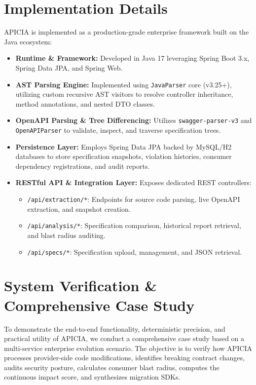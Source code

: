 \documentclass[conference]{IEEEtran}
\begin{document}
\section{Implementation Details}
\label{sec:implementation}

APICIA is implemented as a production-grade enterprise framework built on the Java ecosystem:
\begin{itemize}
    \item \textbf{Runtime \& Framework:} Developed in Java 17 leveraging Spring Boot 3.x, Spring Data JPA, and Spring Web.
    \item \textbf{AST Parsing Engine:} Implemented using \texttt{JavaParser} core (v3.25+), utilizing custom recursive AST visitors to resolve controller inheritance, method annotations, and nested DTO classes.
    \item \textbf{OpenAPI Parsing \& Tree Differencing:} Utilizes \texttt{swagger-parser-v3} and \texttt{OpenAPIParser} to validate, inspect, and traverse specification trees.
    \item \textbf{Persistence Layer:} Employs Spring Data JPA backed by MySQL/H2 databases to store specification snapshots, violation histories, consumer dependency registrations, and audit reports.
    \item \textbf{RESTful API & Integration Layer:} Exposes dedicated REST controllers:
    \begin{itemize}
        \item \texttt{/api/extraction/*}: Endpoints for source code parsing, live OpenAPI extraction, and snapshot creation.
        \item \texttt{/api/analysis/*}: Specification comparison, historical report retrieval, and blast radius auditing.
        \item \texttt{/api/specs/*}: Specification upload, management, and JSON retrieval.
    \end{itemize}
\end{itemize}

\section{System Verification \& Comprehensive Case Study}
\label{sec:evaluation}

To demonstrate the end-to-end functionality, deterministic precision, and practical utility of APICIA, we conduct a comprehensive case study based on a multi-service enterprise evolution scenario. The objective is to verify how APICIA processes provider-side code modifications, identifies breaking contract changes, audits security posture, calculates consumer blast radius, computes the continuous impact score, and synthesizes migration SDKs.
\end{document}
